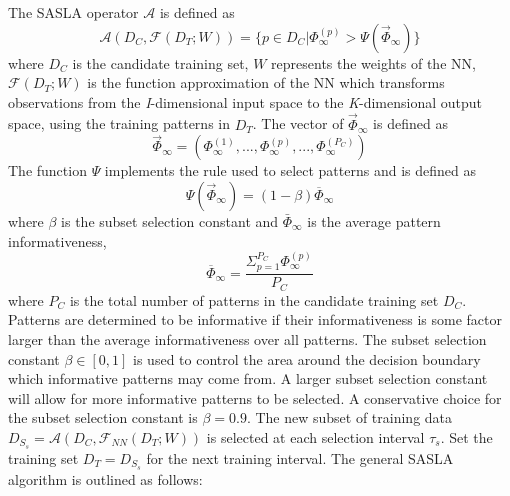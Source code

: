 \documentclass[conference]{IEEEtran}
\begin{document}
	The SASLA operator $\mathcal{A}$ is defined as 
	$$
	\mathcal{A}(D_C, \mathcal{F}(D_T;W)) = \{p\in D_C | \Phi_\infty^{(p)}>\Psi(\vec\Phi_\infty)\}
	$$
	where $D_C$ is the candidate training set, $W$ represents the weights of the NN, $\mathcal{F}(D_T;W)$ is the function approximation of the NN which transforms observations from the \textit{I}-dimensional input space to the \textit{K}-dimensional output space, using the training patterns in $D_T$. The vector of $\vec{\Phi}_\infty$ is defined as
	$$
	\vec{\Phi}_\infty = (\Phi_\infty^{(1)},...,\Phi_\infty^{(p)},...,\Phi_\infty^{(P_C)})
	$$
	The function $\Psi$ implements the rule used to select patterns and is defined as
	$$
	\Psi(\vec\Phi_\infty)=(1-\beta)\overline{\Phi}_\infty
	$$
	where $\beta$ is the subset selection constant and $\bar{\Phi}_\infty$ is the average pattern informativeness,
	$$
	\overline{\Phi}_\infty = \frac{\Sigma_{p=1}^{P_C}\Phi_\infty^{(p)}}{P_C}
	$$
	where $P_C$ is the total number of patterns in the candidate training set $D_C$. Patterns are determined to be informative if their informativeness is some factor larger than the average informativeness over all patterns. The subset selection constant $\beta \in [0, 1]$ is used to control the area around the decision boundary which informative patterns may come from. A larger subset selection constant will allow for more informative patterns to be selected. A conservative choice for the subset selection constant is $\beta=0.9$. The new subset of training data $D_{S_s} = \mathcal{A}(D_C, \mathcal{F}_{NN}(D_T;W))$ is selected at each selection interval $\tau_s$. Set the training set $D_T=D_{S_s}$ for the next training interval. The general SASLA algorithm is outlined as follows:
\end{document}
